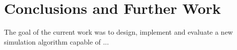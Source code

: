 
\chapter{Conclusions and Further Work} 
\label{ch:Conclusions and Further Work}
The goal of the current work was to design, implement and evaluate a new simulation algorithm capable of ...